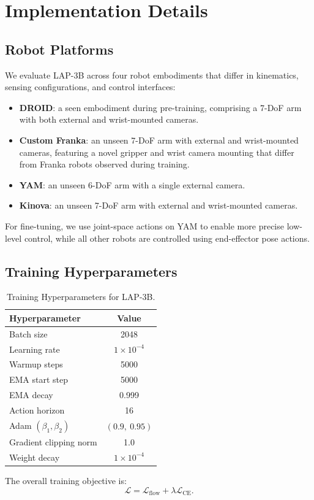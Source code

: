 \section{Implementation Details}
\label{app:implementation_details}

\subsection{Robot Platforms} 
We evaluate \textsc{LAP-3B} across four robot embodiments that differ in kinematics, sensing configurations, and control interfaces:
\begin{itemize}
\item \textbf{DROID}: a seen embodiment during pre-training, comprising a 7-DoF arm with both external and wrist-mounted cameras.
\item \textbf{Custom Franka}: an unseen 7-DoF arm with external and wrist-mounted cameras, featuring a novel gripper and wrist camera mounting that differ from Franka robots observed during training.
\item \textbf{YAM}: an unseen 6-DoF arm with a single external camera.
\item \textbf{Kinova}: an unseen 7-DoF arm with external and wrist-mounted cameras.
\end{itemize}

For fine-tuning, we use joint-space actions on YAM to enable more precise low-level control, while all other robots are controlled using end-effector pose actions.




\subsection{Training Hyperparameters} 
\begin{table}
    \centering
    \small
    \vspace{-1.2cm}
    \caption{Training Hyperparameters for LAP-3B.}
    \label{tab:hyperparams}
    \renewcommand{\arraystretch}{1.15}
    \begin{tabular}{l c}
    \toprule
    \textbf{Hyperparameter} & \textbf{Value} \\
    \midrule
    Batch size & 2048 \\
    Learning rate & $1 \times 10^{-4}$ \\
    Warmup steps & 5000 \\
    EMA start step & 5000 \\
    EMA decay & 0.999 \\
    Action horizon & 16 \\
    Adam $(\beta_1, \beta_2)$ & $(0.9,\ 0.95)$ \\
    Gradient clipping norm & 1.0 \\
    Weight decay & $1 \times 10^{-4}$ \\
    \bottomrule
    \end{tabular}
    \vspace{-8pt}
\end{table}
The overall training objective is:
\[
\mathcal{L} = \mathcal{L}_{\text{flow}} + \lambda \mathcal{L}_{\text{CE}}.
\]

